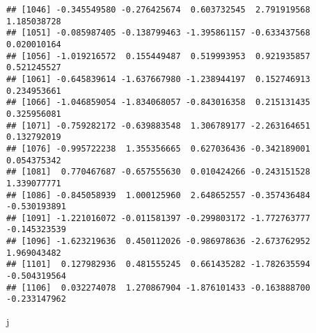 \documentclass[
]{article}
\newenvironment{Shaded}{\begin{snugshade}}{\end{snugshade}}
\newcommand{\NormalTok}[1]{#1}
\begin{document}
\begin{verbatim}
## [1046] -0.345549580 -0.276425674  0.603732545  2.791919568  1.185038728
## [1051] -0.085987405 -0.138799463 -1.395861157 -0.633437568  0.020010164
## [1056] -1.019216572  0.155449487  0.519993953  0.921935857  0.521245527
## [1061] -0.645839614 -1.637667980 -1.238944197  0.152746913  0.234953661
## [1066] -1.046859054 -1.834068057 -0.843016358  0.215131435  0.325956081
## [1071] -0.759282172 -0.639883548  1.306789177 -2.263164651  0.132792019
## [1076] -0.995722238  1.355356665  0.627036436 -0.342189001  0.054375342
## [1081]  0.770467687 -0.657555630  0.010424266 -0.243151528  1.339077771
## [1086] -0.845058939  1.000125960  2.648652557 -0.357436484 -0.530193891
## [1091] -1.221016072 -0.011581397 -0.299803172 -1.772763777 -0.145323539
## [1096] -1.623219636  0.450112026 -0.986978636 -2.673762952  1.969043482
## [1101]  0.127982936  0.481555245  0.661435282 -1.782635594 -0.504319564
## [1106]  0.032274078  1.270867904 -1.876101433 -0.163888700 -0.233147962
\end{verbatim}

\begin{Shaded}
\begin{Highlighting}[]
\NormalTok{j}
\end{Highlighting}
\end{Shaded}
\end{document}
